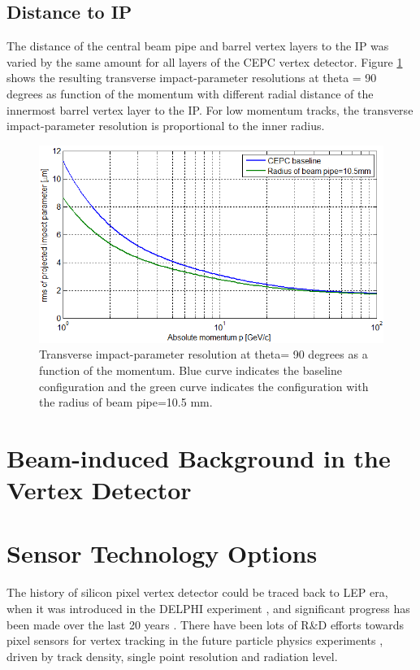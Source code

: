\subsection{Distance to IP}

The distance of the central beam pipe and barrel vertex layers to the IP was varied by the same amount for all layers of the CEPC vertex detector. Figure \ref{fig:distance} shows the resulting transverse impact-parameter resolutions at theta = 90 degrees as function of the momentum with different radial distance of the innermost barrel vertex layer to the IP. For low momentum tracks, the transverse impact-parameter resolution is proportional to the inner radius.
\begin{figure}[h!]
	\centering
	\includegraphics[scale=0.7]{Figures/Vertex/ipr_for_mom.png}
	\caption{Transverse impact-parameter resolution at theta= 90 degrees as a function of the momentum. Blue curve indicates the baseline configuration and the green curve indicates the configuration with the radius of beam pipe=10.5 mm.}
	\label{fig:distance}
\end{figure}

\section{Beam-induced Background in the Vertex Detector}

\section{Sensor Technology Options}

The history of silicon pixel vertex detector could be traced back to LEP era, when it was introduced in the DELPHI experiment \cite{andreazzadelphi}, and significant progress has been made over the last 20 years \cite{hartmann2009delphi}. There have been lots of R\&D efforts towards pixel sensors for vertex tracking in the future particle physics experiments \cite{battaglia2013r}, driven by track density, single point resolution and radiation level. 


